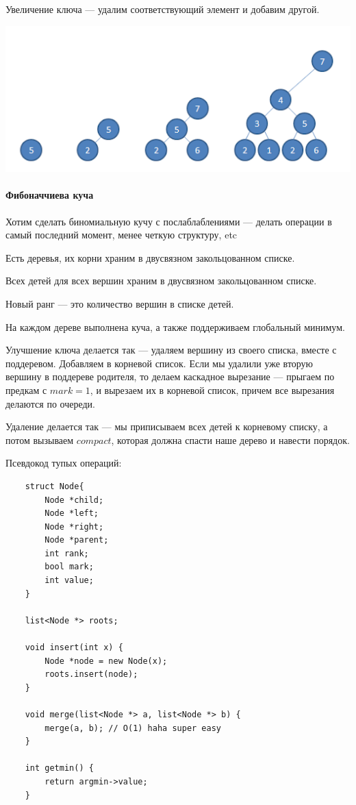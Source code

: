 \documentclass[12pt]{article}
\begin{document}
Увеличение ключа --- удалим соответствующий элемент и добавим другой.

\includegraphics{pictures/binoial_heap.png}
\newpage
\paragraph{Фибоначчиева куча}
\hspace{\fill}

Хотим сделать биномиальную кучу с послаблаблениями --- делать операции в самый последний момент, менее четкую структуру, etc

Есть деревья, их корни храним в двусвязном закольцованном списке.

Всех детей для всех вершин храним в двусвязном закольцованном списке.

Новый ранг --- это количество вершин в списке детей.

На каждом дереве выполнена куча, а также поддерживаем глобальный минимум.

Улучшение ключа делается так --- удаляем вершину из своего списка, вместе с поддеревом. Добавляем в корневой список. Если мы удалили уже вторую вершину в поддереве родителя, то делаем каскадное вырезание --- прыгаем по предкам с $mark = 1$, и вырезаем их в корневой список, причем все вырезания делаются по очереди.

Удаление делается так --- мы приписываем всех детей к корневому списку, а потом вызываем $compact$, которая должна спасти наше дерево и навести порядок.

Псевдокод тупых операций:
\begin{verbatim}
    struct Node{ 
        Node *child;
        Node *left;
        Node *right;
        Node *parent;
        int rank;
        bool mark;
        int value;
    }

    list<Node *> roots;

    void insert(int x) {
        Node *node = new Node(x);
        roots.insert(node);
    }

    void merge(list<Node *> a, list<Node *> b) {
        merge(a, b); // O(1) haha super easy
    }

    int getmin() {
        return argmin->value;
    }
\end{verbatim}
\end{document}
